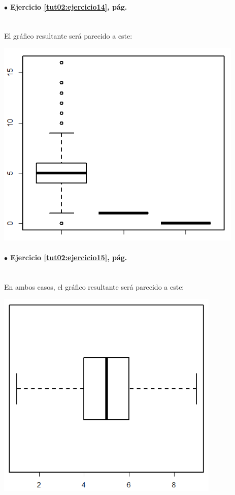 \documentclass[10pt,a4paper]{article}\usepackage[]{graphicx}\usepackage[]{color}
\begin{document}
\paragraph{\bf $\bullet$ Ejercicio \ref{tut02:ejercicio14},  pág. \pageref{tut02:ejercicio14}}
\label{tut02:ejercicio14:sol}\quad\\

El gráfico resultante será parecido a este:
    \begin{center}
    \includegraphics[height=10cm]{../fig/Tut02-57.png}
    \end{center}

\paragraph{\bf $\bullet$ Ejercicio \ref{tut02:ejercicio15},  pág. \pageref{tut02:ejercicio15}}
\label{tut02:ejercicio15:sol}\quad\\

En ambos casos, el gráfico resultante será parecido a este:
    \begin{center}
    \includegraphics[height=10cm]{../fig/Tut02-58.png}
    \end{center}
\end{document}
